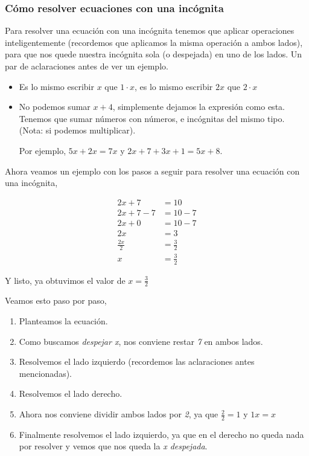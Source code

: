 \documentclass{article}
\begin{document}
\subsubsection*{Cómo resolver ecuaciones con una incógnita}
\begin{small}
Para resolver una ecuación con una incógnita tenemos que aplicar operaciones inteligentemente (recordemos que aplicamos la misma operación a ambos lados), para que nos quede nuestra incógnita sola (o despejada) en uno de los lados.
Un par de aclaraciones antes de ver un ejemplo.
\begin{itemize}
	\item Es lo mismo escribir $x$ que $1\cdot x$, es lo mismo escribir $2x$ que $2\cdot x$
	\item No podemos sumar $x+4$, simplemente dejamos la expresión como esta. Tenemos que sumar números con números, e incógnitas del mismo tipo. (Nota: si podemos multiplicar).
	
	Por ejemplo, $5x+2x=7x$ y $2x+7+3x+1=5x+8$.
\end{itemize}

Ahora veamos un ejemplo con los pasos a seguir para resolver una ecuación con una incógnita,

\begin{align}
2x+7 &= 10\\2x+7-7&=10-7\\2x+0&=10-7\\2x&=3\\\frac{2x}{2}&=\frac{3}{2}\\x&=\frac{3}{2}
\end{align}

Y listo, ya obtuvimos el valor de $x=\frac{3}{2}$

Veamos esto paso por paso,
\begin{enumerate}
	\item Planteamos la ecuación.
	\item Como buscamos \textit{despejar x}, nos conviene restar \textit{7} en ambos lados.
	\item Resolvemos el lado izquierdo (recordemos las aclaraciones antes mencionadas).
	\item Resolvemos el lado derecho.
	\item Ahora nos conviene dividir ambos lados por \textit{2}, ya que $\frac{2}{2}=1$ y $1x=x$
	\item Finalmente resolvemos el lado izquierdo, ya que en el derecho no queda nada por resolver y vemos que nos queda la \textit{x despejada}.
\end{enumerate}
\end{small}
\end{document}

